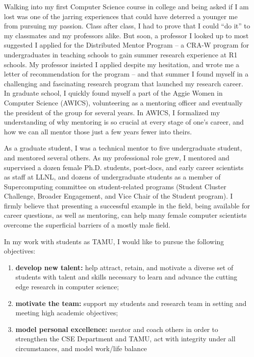 \documentclass[11pt]{article}
\begin{document}
Walking into my first Computer Science course in college and being asked if I am lost
was one of the jarring experiences that could have deterred a younger me from pursuing my passion.
Class after class, I had to prove that I could ``do it'' to my classmates and my professors alike.
But soon, a professor I looked up to most suggested I applied for the Distributed Mentor Program --
a CRA-W program for undergraduates in teaching schools to gain summer research experience at R1 schools.
My professor insisted I applied despite my hesitation, and wrote me a letter of recommendation for the program --
and that summer I found myself in a challenging and fascinating research program that launched my research career.
In graduate school, I quickly found myself a part of the Aggie Women in Computer Science (AWICS), volunteering as a mentoring officer
and eventually the president of the group for several years.  In AWICS, I formalized my understanding of why
mentoring is so crucial at every stage of one's career, and how we can all mentor those just a few years
fewer into theirs.

As a graduate student, I was a technical mentor to five undergraduate student, and mentored several others.
As my professional role grew, I mentored and supervised a dozen female Ph.D. students, post-docs,
and early career scientists as staff at LLNL, and dozens of undergraduate students as a member of
Supercomputing committee on student-related programs (Student Cluster Challenge, Broader Engagement,
and Vice Chair of the Student program).  I firmly believe that presenting a successful example in the field,
being available for career questions, as well as mentoring, can help many female computer scientists overcome the superficial barriers of a mostly male field.

In my work with students as TAMU, I would like to pursue the following objectives:
\begin{enumerate}
\item {\bf develop new talent:} help attract, retain, and motivate a diverse set of students with talent and skills necessary to learn and advance the cutting edge research in computer science;
\item {\bf motivate the team:} support my students and research team in setting and meeting high academic objectives;
\item {\bf model personal excellence:} mentor and coach others in order to strengthen the CSE Department and TAMU, act with integrity under all circumstances, and model work/life balance
\end{enumerate}
\end{document}
